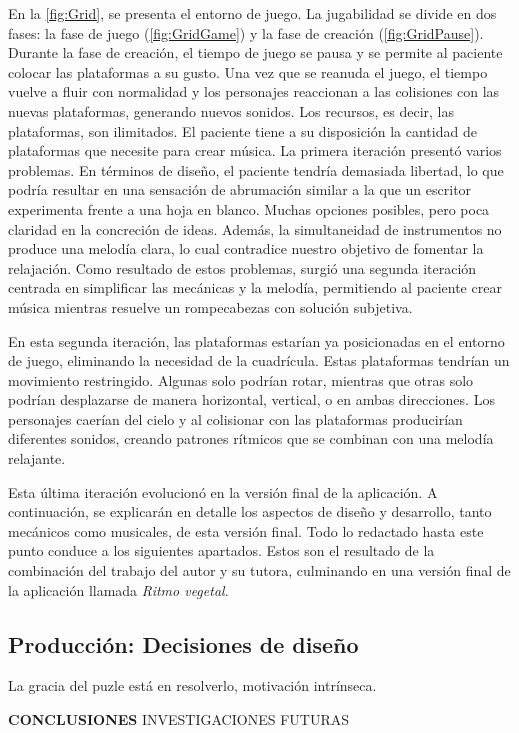 En la \autoref{fig:Grid}, se presenta el entorno de juego. La jugabilidad se divide en dos fases: la fase de juego (\autoref{fig:GridGame}) y la fase de creación (\autoref{fig:GridPause}). Durante la fase de creación, el tiempo de juego se pausa y se permite al paciente colocar las plataformas a su gusto. Una vez que se reanuda el juego, el tiempo vuelve a fluir con normalidad y los personajes reaccionan a las colisiones con las nuevas plataformas, generando nuevos sonidos. Los recursos, es decir, las plataformas, son ilimitados. El paciente tiene a su disposición la cantidad de plataformas que necesite para crear música. La primera iteración presentó varios problemas. En términos de diseño, el paciente tendría demasiada libertad, lo que podría resultar en una sensación de abrumación similar a la que un escritor experimenta frente a una hoja en blanco. Muchas opciones posibles, pero poca claridad en la concreción de ideas. Además, la simultaneidad de instrumentos no produce una melodía clara, lo cual contradice nuestro objetivo de fomentar la relajación. Como resultado de estos problemas, surgió una segunda iteración centrada en simplificar las mecánicas y la melodía, permitiendo al paciente crear música mientras resuelve un rompecabezas con solución subjetiva.

En esta segunda iteración, las plataformas estarían ya posicionadas en el entorno de juego, eliminando la necesidad de la cuadrícula. Estas plataformas tendrían un movimiento restringido. Algunas solo podrían rotar, mientras que otras solo podrían desplazarse de manera horizontal, vertical, o en ambas direcciones. Los personajes caerían del cielo y al colisionar con las plataformas producirían diferentes sonidos, creando patrones rítmicos que se combinan con una melodía relajante. 

Esta última iteración evolucionó en la versión final de la aplicación. A continuación, se explicarán en detalle los aspectos de diseño y desarrollo, tanto mecánicos como musicales, de esta versión final. Todo lo redactado hasta este punto conduce a los siguientes apartados. Estos son el resultado de la combinación del trabajo del autor y su tutora, culminando en una versión final de la aplicación llamada \textit{Ritmo vegetal}.

\subsection{Producción: Decisiones de diseño}

La gracia del puzle está en resolverlo, motivación intrínseca.

\textbf{CONCLUSIONES}
INVESTIGACIONES FUTURAS